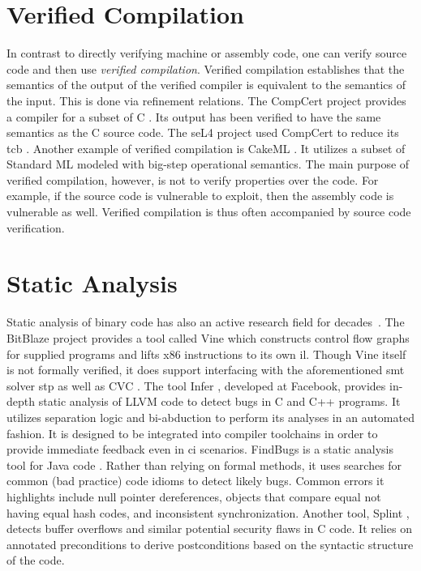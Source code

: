 \section{Verified Compilation}\label{se:verified}
In contrast to directly verifying machine or assembly code,
one can verify source code and then use \emph{verified compilation}.%
Verified compilation establishes that the semantics of the output of the verified compiler
is equivalent to the semantics of the input. This is done via refinement relations.
The CompCert project provides a compiler for a subset of C \autocite{leroy:compcert}.
Its output has been verified to have the same semantics as the C source code.
The seL4 project used CompCert to reduce its \ac{tcb} \autocite{Klein_AEMSKH_14}.
Another example of verified compilation is CakeML \autocite{kumar2014cakeml}.
It utilizes a subset of Standard ML modeled with big-step operational semantics.
The main purpose of verified compilation, however,
is not to verify properties over the code.
For example, if the source code is vulnerable to  exploit,
then the assembly code is vulnerable as well.
Verified compilation is thus often accompanied by source code verification.

\section{Static Analysis}\label{se:static_analysis}
Static analysis of binary code has also an active research field
for decades~\cite{kruegel2005automating,brumley2011bap,wang2017angr}.
The BitBlaze project \cite{song2008bitblaze,BitBlazeWebSite}
provides a tool called Vine which constructs control flow graphs
for supplied programs and lifts x86 instructions to its own \ac{il}.
Though Vine itself is not formally verified,
it does support interfacing with the aforementioned \ac{smt} solver \ac{stp}
as well as CVC \autocite{barrett2004cvcl,barrett2007cvc3}.
The tool Infer \autocite{calcagno2011infer}, developed at Facebook,
provides in-depth static analysis of LLVM code to detect bugs in C and C++ programs.
It utilizes separation logic \cite{reynolds2002separation}
and bi-abduction to perform its analyses in an automated fashion.
It is designed to be integrated into compiler toolchains
in order to provide immediate feedback even in \ac{ci} scenarios.
FindBugs is a static analysis tool for Java code \autocite{hovemeyer2004findbugs}.
Rather than relying on formal methods,
it uses searches for common (bad practice) code idioms to detect likely bugs.
Common errors it highlights include null pointer dereferences,
objects that compare equal not having equal hash codes,
and inconsistent synchronization.
Another tool, Splint \autocite{evans2002static}, detects buffer overflows
and similar potential security flaws in C code.
It relies on annotated preconditions to derive postconditions
based on the syntactic structure of the code.

